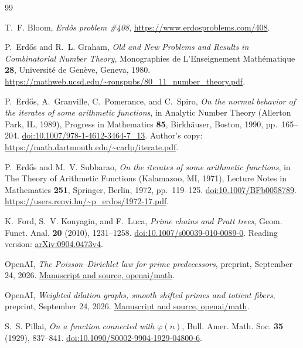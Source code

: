 \documentclass[10pt]{article}
\begin{document}
\begin{thebibliography}{99}

T.~F. Bloom, \emph{Erd\H{o}s problem \#408}, \url{https://www.erdosproblems.com/408}.

P.~Erd\H{o}s and R.~L. Graham, \emph{Old and New Problems and Results in Combinatorial Number Theory}, Monographies de L'Enseignement Math\'ematique \textbf{28}, Universit\'e de Gen\`eve, Geneva, 1980. \url{https://mathweb.ucsd.edu/~ronspubs/80_11_number_theory.pdf}.

P.~Erd\H{o}s, A.~Granville, C.~Pomerance, and C.~Spiro, \emph{On the normal behavior of the iterates of some arithmetic functions}, in Analytic Number Theory (Allerton Park, IL, 1989), Progress in Mathematics \textbf{85}, Birkh\"auser, Boston, 1990, pp.~165--204. \href{https://doi.org/10.1007/978-1-4612-3464-7_13}{doi:10.1007/978-1-4612-3464-7\_13}. Author's copy: \url{https://math.dartmouth.edu/~carlp/iterate.pdf}.

P.~Erd\H{o}s and M.~V. Subbarao, \emph{On the iterates of some arithmetic functions}, in The Theory of Arithmetic Functions (Kalamazoo, MI, 1971), Lecture Notes in Mathematics \textbf{251}, Springer, Berlin, 1972, pp.~119--125. \href{https://doi.org/10.1007/BFb0058789}{doi:10.1007/BFb0058789}. \url{https://users.renyi.hu/~p_erdos/1972-17.pdf}.

K.~Ford, S.~V. Konyagin, and F.~Luca, \emph{Prime chains and Pratt trees}, Geom. Funct. Anal. \textbf{20} (2010), 1231--1258. \href{https://doi.org/10.1007/s00039-010-0089-0}{doi:10.1007/s00039-010-0089-0}. Reading version: \href{https://arxiv.org/abs/0904.0473v4}{arXiv:0904.0473v4}.

OpenAI, \emph{The Poisson--Dirichlet law for prime predecessors}, preprint, September 24, 2026. \href{https://github.com/openai/math/blob/main/preprints/The-Poisson-Dirichlet-Law-for-Prime-Predecessors-September-24-2026/paper.pdf}{Manuscript and source, openai/math}.

OpenAI, \emph{Weighted dilation graphs, smooth shifted primes and totient fibers}, preprint, September 24, 2026. \href{https://github.com/openai/math/blob/main/preprints/Weighted-Dilation-Graphs-Smooth-Shifted-Primes-and-Totient-Fibers-September-24-2026/paper.pdf}{Manuscript and source, openai/math}.

S.~S. Pillai, \emph{On a function connected with $\varphi(n)$}, Bull. Amer. Math. Soc. \textbf{35} (1929), 837--841. \href{https://doi.org/10.1090/S0002-9904-1929-04800-6}{doi:10.1090/S0002-9904-1929-04800-6}.


\end{thebibliography}
\end{document}
